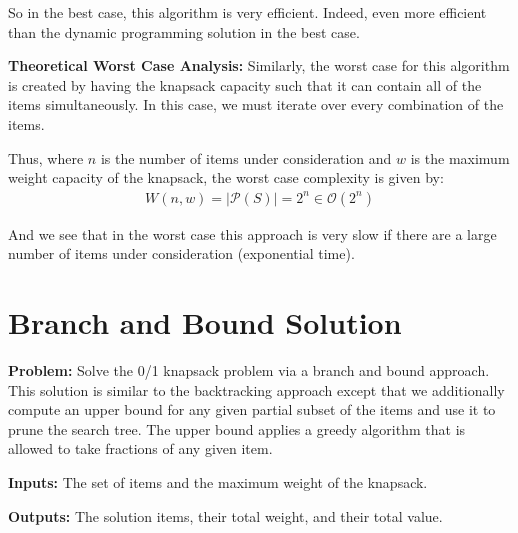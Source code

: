 \documentclass{article}
\begin{document}
So in the best case, this algorithm is very efficient.
Indeed, even more efficient than the dynamic programming solution in the best case.

\textbf{Theoretical Worst Case Analysis:}
Similarly, the worst case for this algorithm is created by having the knapsack capacity such that it can contain all of the items simultaneously.
In this case, we must iterate over every combination of the items.

Thus, where $n$ is the number of items under consideration and $w$ is the maximum weight capacity of the knapsack, the worst case complexity is given by:
\begin{align}
W(n, w) = |\mathscr{P}(S)| = 2^n \in \mathcal{O}(2^n)
\end{align}

And we see that in the worst case this approach is very slow if there are a large number of items under consideration (exponential time).

\pagebreak
\section{Branch and Bound Solution}

\textbf{Problem:}
Solve the 0/1 knapsack problem via a branch and bound approach.
This solution is similar to the backtracking approach except that we additionally compute an upper bound for any given partial subset of the items and use it to prune the search tree.
The upper bound applies a greedy algorithm that is allowed to take fractions of any given item.

\textbf{Inputs:}
The set of items and the maximum weight of the knapsack.

\textbf{Outputs:}
The solution items, their total weight, and their total value.
\end{document}
